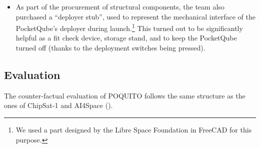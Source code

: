 \documentclass[a4paper,nobib,justified,final]{tufte-book}
\begin{document}
\begin{itemize}[itemsep=-1ex]
	\item As part of the procurement of structural components, the team also purchased a ``deployer stub'', used to represent the mechanical interface of the PocketQube's deployer during launch.\footnote{We used a part designed by the Libre Space Foundation in FreeCAD for this purpose.} This turned out to be significantly helpful as a fit check device, storage stand, and to keep the PocketQube turned off (thanks to the deployment switches being pressed).
\end{itemize}

\subsection{Evaluation}
\label{sec:CASESTUDIES_poquito_evaluation}

The counter-factual evaluation of POQUITO follows the same structure as the ones of ChipSat-1 and AI4Space ().
\end{document}
